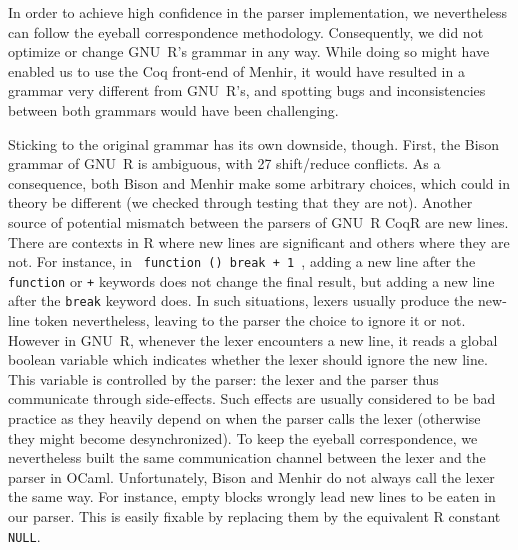 \documentclass[
    sigplan,
    10pt,
    review, %
    natbib=false %
 ]{acmart}
\newcommand\mb[1]{\todo[color=purple!20,size=\scriptsize]{#1}}
\newcommand\mbi[1]{\todo[color=purple!20,inline]{#1}}
\newcommand\CoqR{CoqR}
\begin{document}
In order to achieve high confidence in the parser implementation, we nevertheless can follow the eyeball correspondence methodology.
Consequently, we did not optimize or change GNU~R's grammar in any way.
While doing so might have enabled us to use the Coq front-end of Menhir, it would have resulted in a grammar very different from GNU~R's, and spotting bugs and inconsistencies between both grammars would have been challenging.

Sticking to the original grammar has its own downside, though. First, the Bison grammar of GNU~R is ambiguous, with 27 shift/reduce conflicts.
As a consequence, both Bison and Menhir make some arbitrary choices,
which could in theory be different (we checked through testing that they are not).
Another source of potential mismatch
between the parsers of GNU~R \CoqR{} are new lines.
There are contexts in R where new lines are significant
and others where they are not.
For instance, in \texttt{{ function () break + 1 }},
adding a new line after the \texttt{function} or \texttt{+} keywords does not change the final result,
but adding a new line after the \texttt{break} keyword does.
%
In such situations, lexers usually produce the new-line token
nevertheless, leaving to the parser the choice to ignore it or not.
However in GNU~R, whenever the lexer encounters a new line,
it reads a global boolean variable %
which indicates whether the lexer should ignore the new line.
This variable is controlled by the parser:
the lexer and the parser thus communicate through side-effects.
%
Such effects are usually considered to be bad practice
as they heavily depend on when the parser calls the lexer
(otherwise they might become desynchronized).
%
To keep the eyeball correspondence,
we nevertheless built the same communication channel
between the lexer and the parser in OCaml.
Unfortunately, Bison and Menhir do not always call the lexer
the same way.
%
For instance, empty blocks \texttt{{}} wrongly
lead new lines to be eaten in our parser.
This is easily fixable by replacing them
by the equivalent R constant \texttt{NULL}.
\end{document}
